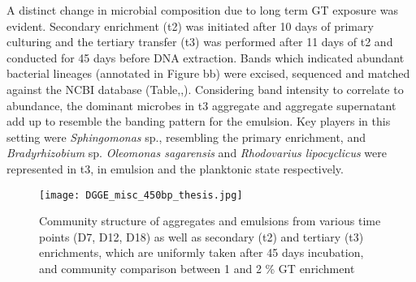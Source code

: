 \documentclass[twoside]{article}
\begin{document}
A distinct change in microbial composition due to long term GT exposure was evident. Secondary enrichment (t2) was initiated after 10 days of primary culturing and the tertiary transfer (t3) was performed after 11 days of t2 and conducted for 45 days before DNA extraction. Bands which indicated abundant bacterial lineages (annotated in Figure bb) were excised, sequenced and matched against the NCBI database (Table,,). 
Considering band intensity to correlate to abundance, the dominant microbes in t3 aggregate and aggregate supernatant add up to resemble the banding pattern for the emulsion. 
Key players in this setting were \emph{Sphingomonas} sp., resembling the primary enrichment, and \emph{Bradyrhizobium} sp. \emph{Oleomonas sagarensis} and \emph{Rhodovarius lipocyclicus} were represented in t3, in emulsion and the planktonic state respectively.

\begin{figure}
\texttt{[image: DGGE\_misc\_450bp\_thesis.jpg]}
\caption{Community structure of aggregates and emulsions from various time points (D7, D12, D18) as well as secondary (t2) and tertiary (t3) enrichments, which are uniformly taken after 45 days incubation, and community comparison between 1 and 2 \% GT enrichment}
\end{figure}
\end{document}
